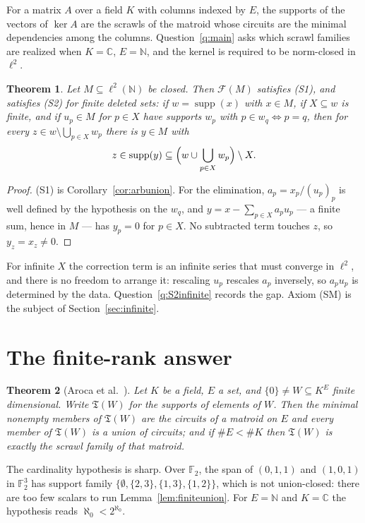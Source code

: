 \documentclass[11pt,reqno]{amsart}
\newtheorem{theorem}{Theorem}[section]
\theoremstyle{definition}
\DeclareMathOperator{\supp}{supp}
\newcommand{\N}{\mathbb{N}}
\newcommand{\C}{\mathbb{C}}
\newcommand{\F}{\mathcal{F}}
\newcommand{\T}{\mathfrak{T}}
\begin{document}
For a matrix $A$ over a field $K$ with columns indexed by $E$, the supports of
the vectors of $\ker A$ are the scrawls of the matroid whose circuits are the
minimal dependencies among the columns. Question~\ref{q:main} asks which scrawl
families are realized when $K=\C$, $E=\N$, and the kernel is required to be
norm-closed in $\ell^2$.

\begin{theorem}\label{thm:S1S2}
Let $M\subseteq\ell^2(\N)$ be closed. Then $\F(M)$ satisfies \textup{(S1)}, and
satisfies \textup{(S2)} for finite deleted sets: if $w=\supp(x)$ with $x\in M$,
if $X\subseteq w$ is finite, and if $u_p\in M$ for $p\in X$ have supports $w_p$
with $p\in w_q\iff p=q$, then for every
$z\in w\setminus\bigcup_{p\in X}w_p$ there is $y\in M$ with
\[
z\in\supp(y)\subseteq\Bigl(w\cup\bigcup_{p\in X}w_p\Bigr)\setminus X.
\]
\end{theorem}

\begin{proof}
(S1) is Corollary~\ref{cor:arbunion}. For the elimination, $a_p=x_p/(u_p)_p$ is
well defined by the hypothesis on the $w_q$, and
$y=x-\sum_{p\in X}a_pu_p$ --- a finite sum, hence in $M$ --- has $y_p=0$ for
$p\in X$. No subtracted term touches $z$, so $y_z=x_z\neq0$.
\end{proof}

For infinite $X$ the correction term is an infinite series that must converge
in $\ell^2$, and there is no freedom to arrange it: rescaling $u_p$ rescales
$a_p$ inversely, so $a_pu_p$ is determined by the data.
Question~\ref{q:S2infinite} records the gap. Axiom (SM) is the subject of
Section~\ref{sec:infinite}.

\section{The finite-rank answer}\label{sec:finiterank}

\begin{theorem}[Aroca et al.\ {\cite[Thms.~2.15, 3.5]{ABFGGV}}]\label{thm:ABFGGV}
Let $K$ be a field, $E$ a set, and $\{0\}\neq W\subseteq K^E$ finite
dimensional. Write $\T(W)$ for the supports of elements of $W$. Then the
minimal nonempty members of $\T(W)$ are the circuits of a matroid on $E$ and
every member of $\T(W)$ is a union of circuits; and if $\#E<\#K$ then $\T(W)$
is exactly the scrawl family of that matroid.
\end{theorem}

The cardinality hypothesis is sharp. Over $\mathbb F_2$, the span of $(0,1,1)$
and $(1,0,1)$ in $\mathbb F_2^3$ has support family
$\{\emptyset,\{2,3\},\{1,3\},\{1,2\}\}$, which is not union-closed: there are
too few scalars to run Lemma~\ref{lem:finiteunion}. For $E=\N$ and $K=\C$ the
hypothesis reads $\aleph_0<2^{\aleph_0}$.
\end{document}

